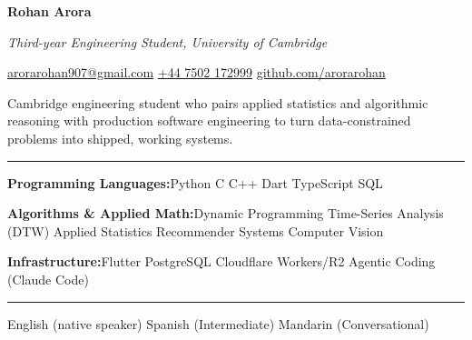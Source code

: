 \documentclass[11pt]{article}
\newcommand{\cvsection}[1]{%
  \vspace{10pt}%
  \noindent{\large\bfseries\MakeUppercase{#1}}\par
  \vspace{-4pt}\noindent\rule{\linewidth}{0.7pt}\vspace{4pt}%
}
\newcommand{\sep}{\quad\textbar\quad}
\begin{document}
\begin{center}
  {\Huge\bfseries Rohan Arora}\par
  \vspace{4pt}
  {\Large\itshape Third-year Engineering Student, University of Cambridge}\par
  \vspace{6pt}
  \href{mailto:arorarohan907@gmail.com}{arorarohan907@gmail.com}
  \sep
  \href{tel:+447502172999}{+44 7502 172999}
\sep \href{https://github.com/arorarohan}{github.com/arorarohan}
\end{center}

\vspace{6pt}

Cambridge engineering student who pairs applied statistics and algorithmic reasoning with production software engineering to turn data-constrained problems into shipped, working systems.

\cvsection{Skills}
\textbf{Programming Languages:}\quad\quad Python \sep C \sep C++ \sep Dart \sep TypeScript \sep SQL

\textbf{Algorithms \& Applied Math:}\quad\quad Dynamic Programming \sep Time-Series Analysis (DTW) \sep Applied Statistics \sep Recommender Systems \sep Computer Vision

\textbf{Infrastructure:}\quad\quad Flutter \sep PostgreSQL \sep Cloudflare Workers\slash R2 \sep Agentic Coding (Claude Code) 


\cvsection{Languages}
English (native speaker) \sep Spanish (Intermediate) \sep Mandarin (Conversational)
\end{document}
